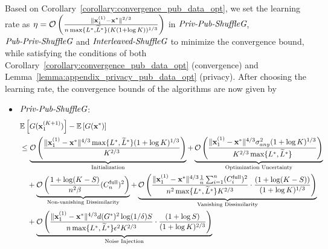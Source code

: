 Based on Corollary~\ref{corollary:convergence_pub_data_opt},
we set the learning rate as $\eta = {\mathcal{O}}\left( \frac{\|{\mathbf{x}}_1^{(1)} - {\mathbf{x}}^*\|^{2/3}}{n \max\{L^{*}, \widetilde{L}^{*}\} (K(1+\log K))^{1/3}} \right)$ in $\textit{Priv-Pub-ShuffleG}$, $\textit{Pub-Priv-ShuffleG}$ and $\textit{Interleaved-ShuffleG}$
to minimize the convergence bound, while satisfying the conditions of both Corollary~\ref{corollary:convergence_pub_data_opt} (convergence) and Lemma~\ref{lemma:appendix_privacy_pub_data_opt} (privacy). 
After choosing the learning rate, the convergence bounds of the algorithms are now given by
\begin{itemize}
    \item $\textit{Priv-Pub-ShuffleG}$:
    \begin{align*}
        &\mathbb{E}\left[ G({\mathbf{x}}_1^{(K+1)}) \right] - \mathbb{E}\left[G({\mathbf{x}}^*)\right]\\
        &\leq \underbrace{ {\mathcal{O}} \left( 
                \frac{\|{\mathbf{x}}_1^{(1)} - {\mathbf{x}}^*\|^{4/3} \max\{L^{*}, \widetilde{L}^{*}\} (1+\log K)^{1/3}}{K^{2/3}} \right)
            }_{\text{Initialization}}
        + \underbrace{ {\mathcal{O}} \left( 
            \frac{\|{\mathbf{x}}_1^{(1)} - {\mathbf{x}}^*\|^{4/3} \sigma_{any}^2 (1+\log K)^{1/3}}
            {K^{2/3} \max\{L^{*}, \widetilde{L}^{*} \} } 
            \right)
        }_{\text{Optimization Uncertainty}}\\
        &\quad + \underbrace{
            {\mathcal{O}}\left( 
            \frac{1 + \log (K-S) }{n^2 \beta} (C_n^{\text{full}})^2 \right)
        }_{\text{Non-vanishing Dissimilarity}}
            + \underbrace{
                {\mathcal{O}} \left( \frac{\|{\mathbf{x}}_1^{(1)} - {\mathbf{x}}^*\|^{4/3} \frac{1}{n}\sum_{i=1}^{n}(C_i^{\text{full}})^2}
                {n^2 \max\{L^{*}, \widetilde{L}^{*}\} K^{2/3}}
                \cdot \frac{(1+ \log (K- S))}{(1+ \log K)^{1/3}} \right)
        }_{\text{Vanishing Dissimilarity}} \\
        &\quad + \underbrace{ {\mathcal{O}}\left( 
            \frac{\|{\mathbf{x}}_1^{(1)} - {\mathbf{x}}^{*}\|^{4/3}d (G^{*})^2 \log (1/\delta) S }
            {n \max\{L^{*}, \widetilde{L}^{*} \} {\epsilon}^2 K^{2/3}} \cdot \frac{(1+ \log S )}{(1 + \log K)^{2/3}}
        \right)
        }_{\text{Noise Injection}}
    \end{align*}


\end{itemize}
